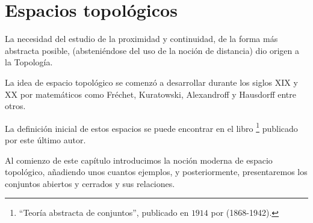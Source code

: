 

\chapter{Espacios topológicos}
\label{etop}
La necesidad del estudio de la proximidad y continuidad, de la forma más abstracta posible, (absteniéndose del uso de la noción de distancia) dio origen a la Topología.

La idea de espacio topológico se comenzó a desarrollar durante los siglos XIX y XX por matemáticos como Fréchet, Kuratowski, Alexandroff y Hausdorff entre otros.

La definición inicial de estos espacios se puede encontrar en el libro \footnote{``Teoría abstracta de conjuntos'', publicado en $1914$ por (1868-1942).} publicado por este último autor.


Al comienzo de este capítulo introducimos la noción moderna de espacio topológico, añadiendo unos cuantos ejemplos, y posteriormente, presentaremos los conjuntos abiertos y cerrados y sus relaciones.%
